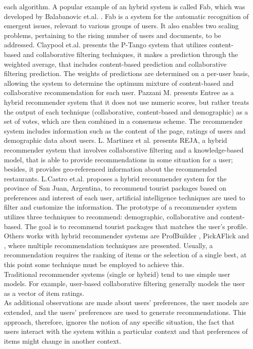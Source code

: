 each algorithm.
A popular example of an hybrid system is called Fab, which was
developed by  Balabanovic et.al. \cite{balabanovic1997fab}. Fab is a
system  for the automatic recognition of emergent issues, relevant to
various  groups of users. It also enables two scaling problems,
pertaining to the rising number of users and documents, to be
addressed.  Claypool et.al. \cite{claypool1999combining}  presents the
P-Tango system that utilizes content-based and collaborative filtering
techniques, it makes a prediction through the weighted average, that
includes content-based prediction and collaborative filtering
prediction. The weights of predictions are determined on a per-user
basis, allowing the system to determine the optimum mixture of
content-based and collaborative recommendation for each user. Pazzani
M. \cite{pazzani1999framework} presents Entree as a hybrid recommender
system that it does not use numeric scores, but rather treats the
output of each technique (collaborative, content-based and
demographic) as a set of votes, which are then combined in a consensus
scheme. The recommender system includes information such as the
content of the page, ratings of users and demographic data about
users.
L. Martinez et al. \cite{martinez2009reja} presents REJA, a hybrid
recommender system that involves collaborative filtering and a
knowledge-based model, that is able to provide recommendations in some
situation for a user; besides, it provides geo-referenced information
about the recommended restaurants.
L.Castro et.al. \cite{castro2012prototype} proposes  
a hybrid recommender system for the province of San Juan, Argentina, 
to recommend tourist packages  based on preferences and interest 
of each user, artificial intelligence
techniques are used to filter and customize the information. The
prototype of a recommender system utilizes three techniques to
recommend: demographic, collaborative and content-based. The goal is
to recommend tourist packages that matches the user's profile.
Others works with hybrid recommender systems are ProfBuilder
  \cite{al1999semantic}, PickAFlick \cite{burke1999integrating}  and
  \cite{tran2000hybrid}, where multiple recommendation
techniques are presented. Usually, a recommendation requires the ranking of
items or the selection of a single best, at this point some
technique must be employed to achieve this. \\ 
Traditional recommender systems (single or hybrid) tend to use
simple user models. For example, user-based collaborative filtering
generally models the user as a vector of item ratings. \\ As additional
observations are made about users' preferences, the user models are
extended, and the users' preferences are used to generate
recommendations. This approach, therefore, ignores the notion of any
specific situation, the fact that users interact with the system
within a particular context and  that preferences of items might 
change in another context. 

